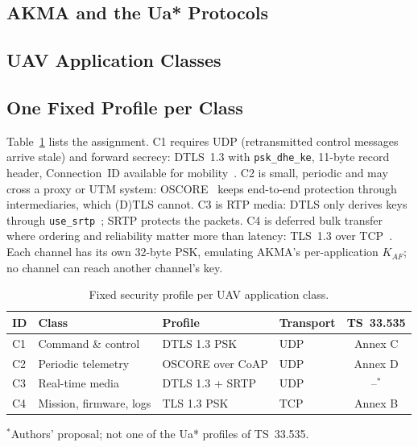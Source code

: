 \documentclass[conference]{IEEEtran}
\begin{document}
\subsection{AKMA and the Ua* Protocols}

\subsection{UAV Application Classes}

\subsection{One Fixed Profile per Class}
Table~\ref{tab:profiles} lists the assignment. C1 requires UDP (retransmitted
control messages arrive stale) and forward secrecy: DTLS~1.3 with
\texttt{psk\_dhe\_ke}, 11-byte record header, Connection~ID available for
mobility~\cite{rfc9147,rfc9146}. C2 is small, periodic and may cross a proxy
or UTM system: OSCORE~\cite{rfc8613} keeps end-to-end protection through
intermediaries, which (D)TLS cannot. C3 is RTP media: DTLS only derives keys
through \texttt{use\_srtp}~\cite{rfc5764}; SRTP protects the packets. C4 is
deferred bulk transfer where ordering and reliability matter more than
latency: TLS~1.3 over TCP~\cite{rfc8446}. Each channel has its own 32-byte
PSK, emulating AKMA's per-application $K_{AF}$; no channel can reach another
channel's key.

\begin{table}[t]
\centering
\caption{Fixed security profile per UAV application class.}
\label{tab:profiles}
\begin{tabular}{llllc}
\toprule
ID & Class & Profile & Transport & TS~33.535 \\
\midrule
C1 & Command \& control & DTLS 1.3 PSK & UDP & Annex C \\
C2 & Periodic telemetry & OSCORE over CoAP & UDP & Annex D \\
C3 & Real-time media & DTLS 1.3 + SRTP & UDP & --$^{\ast}$ \\
C4 & Mission, firmware, logs & TLS 1.3 PSK & TCP & Annex B \\
\bottomrule
\end{tabular}
\begin{flushleft}\footnotesize
$^{\ast}$Authors' proposal; not one of the Ua* profiles of TS~33.535.
\end{flushleft}
\end{table}
\end{document}
